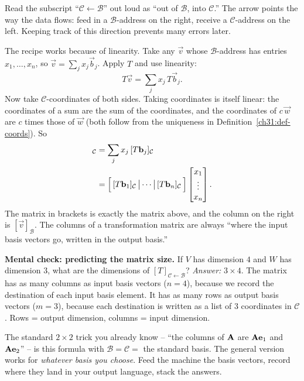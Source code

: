 Read the subscript ``$\mathcal{C}\leftarrow\mathcal{B}$'' out loud as ``out of
$\mathcal{B}$, into $\mathcal{C}$.'' The arrow points the way the data flows: feed
in a $\mathcal{B}$-address on the right, receive a $\mathcal{C}$-address on the
left. Keeping track of this direction prevents many errors later.

The recipe works because of linearity. Take any $\vec{v}$ whose
$\mathcal{B}$-address has entries $x_1,\dots,x_n$, so
$\vec{v}=\sum_j x_j\vec{b}_j$. Apply $T$ and use linearity:
\[
  T\vec{v} = \sum_{j} x_j\, T\vec{b}_j.
\]
Now take $\mathcal{C}$-coordinates of both sides. Taking coordinates is itself
linear: the coordinates of a sum are the sum of the coordinates, and the
coordinates of $c\,\vec{w}$ are $c$ times those of $\vec{w}$ (both follow from
the uniqueness in Definition~\ref{ch31:def-coords}). So
\begin{align*}
  [T\vec{v}]_{\mathcal{C}} &= \sum_j x_j\,[T\vec{b}_j]_{\mathcal{C}} \\
  &= \Big[\,[T\vec{b}_1]_{\mathcal{C}}\,\big|\cdots\big|\,[T\vec{b}_n]_{\mathcal{C}}\,\Big]\colvec{x_1\\\vdots\\x_n}.
\end{align*}
The matrix in brackets is exactly the matrix above, and the column on the right is
$[\vec{v}]_{\mathcal{B}}$. The columns of a transformation matrix are always
``where the input basis vectors go, written in the output basis.''

\begin{recoverybox}
\textbf{Mental check: predicting the matrix size.}
If $V$ has dimension $4$ and $W$ has dimension $3$, what are the dimensions of $[T]_{\mathcal{C}\leftarrow\mathcal{B}}$?
\emph{Answer:} $3\times 4$. The matrix has as many columns as input basis vectors ($n=4$), because we record the destination of each input basis element. It has as many rows as output basis vectors ($m=3$), because each destination is written as a list of $3$ coordinates in $\mathcal{C}$. Rows = output dimension, columns = input dimension.
\end{recoverybox}

\begin{intuitionbox}
The standard $2\times 2$ trick you already know -- ``the columns of $\mathbf{A}$ are
$\mathbf{A}\mathbf{e}_1$ and $\mathbf{A}\mathbf{e}_2$'' -- is this formula with
$\mathcal{B}=\mathcal{C}=$ the standard basis. The general version works for
\emph{whatever basis you choose}. Feed the machine the basis vectors, record where they land in your
output language, stack the answers.
\end{intuitionbox}

